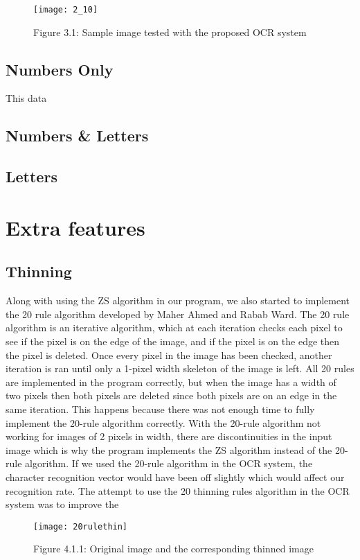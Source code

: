 \documentclass[twocolumn]{article}
\begin{document}
\begin{figure}[h]
\centering
\texttt{[image: 2\_10]}
\caption*{Figure 3.1: Sample image tested with the proposed OCR system}
\end{figure}

\subsection{Numbers Only}
This data
\subsection{Numbers \& Letters}
\subsection{Letters}
\section{Extra features}
\subsection{Thinning}
Along with using the ZS algorithm in our program, we also started to implement the 20 rule algorithm developed by Maher Ahmed and Rabab Ward.  The 20 rule algorithm is an iterative algorithm, which at each iteration checks each pixel to see if the pixel is on the edge of the image, and if the pixel is on the edge then the pixel is deleted.  Once every pixel in the image has been checked, another iteration is ran until only a 1-pixel width skeleton of the image is left.  All 20 rules are implemented in the program correctly, but when the image has a width of two pixels then both pixels are deleted since both pixels are on an edge in the same iteration.  This happens because there was not enough time to fully implement the 20-rule algorithm correctly. With the 20-rule algorithm not working for images of 2 pixels in width, there are discontinuities in the input image which is why the program implements the ZS algorithm instead of the 20-rule algorithm.  If we used the 20-rule algorithm in the OCR system, the character recognition vector would have been off slightly which would affect our recognition rate.  The attempt to use the 20 thinning rules algorithm in the OCR system was to improve the 


\begin{figure}[h]
\centering
\texttt{[image: 20rulethin]}
\caption*{Figure 4.1.1: Original image and the corresponding thinned image}
\end{figure}
\end{document}
